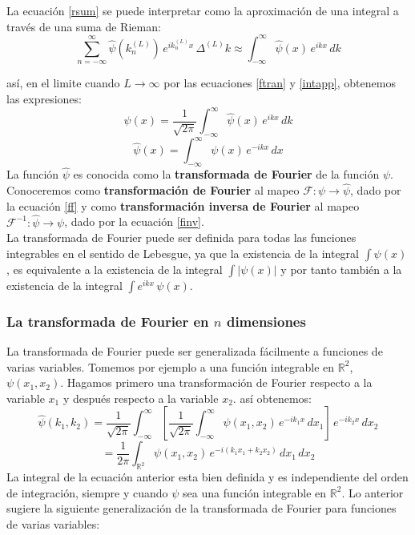 \documentclass[12pt]{book}
\numberwithin{equation}{chapter}
\def\R{\mathbb{R}}
\def\rar{\rightarrow}
\def\F{\mathcal{F}}
\begin{document}
La ecuaci\'on \eqref{rsum} se puede interpretar como la aproximaci\'on de una integral a trav\'es de una suma de Rieman:
\begin{equation}\label{intapp}
\sum_{n=-\infty}^{\infty} \hat{\psi}(k_{n}^{(L)})\, e^{ik_{n}^{(L)}x} \, \Delta^{(L)} k \approx \int_{-\infty}^{\infty} \hat{\psi}(x) \, e^{ikx}\, dk
\end{equation}

as\'i, en el limite cuando $L \rar \infty$ por las ecuaciones \eqref{ftran} y \eqref{intapp}, obtenemos las expresiones:
\begin{equation}\label{finv}
\psi(x)= \frac{1}{\sqrt{2 \pi}} \int_{-\infty}^{\infty} \hat{\psi}(x)\, e^{ikx}\, dk
\end{equation}
\begin{equation}\label{ff}
\hat{\psi}(x) = \int_{- \infty}^{\infty} \psi(x)\, e^{-ikx}\, dx
\end{equation}
La funci\'on $\hat{\psi}$ es conocida como la {\bf transformada de Fourier} de la funci\'on $\psi$. Conoceremos como {\bf transformaci\'on de Fourier} al mapeo $\F: \psi \rar \hat{\psi}$, dado por la ecuaci\'on \eqref{ff} y como {\bf transformaci\'on inversa de Fourier} al mapeo $\F^{-1}: \hat{\psi} \rar \psi $, dado por la ecuaci\'on \eqref{finv}.\\

La transformada de Fourier puede ser definida para todas las funciones integrables en el sentido de Lebesgue, ya que la existencia de la integral $\int \psi(x)$, es equivalente a la existencia de la integral $\int |\psi(x)|$ y por tanto tambi\'en a la existencia de la integral $ \int e^{ikx}\, \psi(x) $. \\

\newpage

\subsubsection{La transformada de Fourier en $n$ dimensiones}
La transformada de Fourier puede ser generalizada f\'acilmente a funciones de varias variables. Tomemos por ejemplo a una funci\'on integrable en $\R^{2}$, $\psi (x_{1},x_{2})$. Hagamos primero una transformaci\'on de Fourier respecto a la variable $x_{1}$ y despu\'es respecto a la variable $x_{2}$. as\'i obtenemos:
$$ \hat{\psi}(k_{1},k_{2})= \frac{1}{\sqrt{2 \pi}} \int_{-\infty}^{\infty} \left[ \frac{1}{\sqrt{2 \pi}} \int_{-\infty}^{\infty} \psi(x_{1},x_{2})\, e^{-ik_{1}x}\, dx_{1}  \right]\, e^{-ik_{2}x}\, dx_{2} $$
\begin{equation}
= \frac{1}{2 \pi} \int_{\R^{2}} \psi(x_{1},x_{2})\, e^{-i(k_{1}x_{1}+k_{2}x_{2})}\, dx_{1}\, dx_{2}
\end{equation}
La integral de la ecuaci\'on anterior esta bien definida y es independiente del orden de integraci\'on, siempre y cuando $\psi$ sea una funci\'on integrable en $\R^{2}$. Lo anterior sugiere la siguiente generalizaci\'on de la transformada de Fourier para funciones de varias variables:
\end{document}
